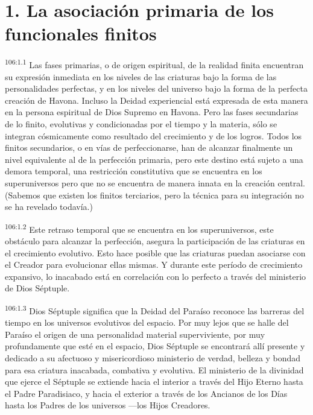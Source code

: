\section*{1. La asociación primaria de los funcionales finitos}
\par
\textsuperscript{106:1.1} Las fases primarias, o de origen espiritual, de la realidad finita encuentran su expresión inmediata en los niveles de las criaturas bajo la forma de las personalidades perfectas, y en los niveles del universo bajo la forma de la perfecta creación de Havona. Incluso la Deidad experiencial está expresada de esta manera en la persona espiritual de Dios Supremo en Havona. Pero las fases secundarias de lo finito, evolutivas y condicionadas por el tiempo y la materia, sólo se integran cósmicamente como resultado del crecimiento y de los logros. Todos los finitos secundarios, o en vías de perfeccionarse, han de alcanzar finalmente un nivel equivalente al de la perfección primaria, pero este destino está sujeto a una demora temporal, una restricción constitutiva que se encuentra en los superuniversos pero que no se encuentra de manera innata en la creación central. (Sabemos que existen los finitos terciarios, pero la técnica para su integración no se ha revelado todavía.)

\par
\textsuperscript{106:1.2} Este retraso temporal que se encuentra en los superuniversos, este obstáculo para alcanzar la perfección, asegura la participación de las criaturas en el crecimiento evolutivo. Esto hace posible que las criaturas puedan asociarse con el Creador para evolucionar ellas mismas. Y durante este período de crecimiento expansivo, lo inacabado está en correlación con lo perfecto a través del ministerio de Dios Séptuple.

\par
\textsuperscript{106:1.3} Dios Séptuple significa que la Deidad del Paraíso reconoce las barreras del tiempo en los universos evolutivos del espacio. Por muy lejos que se halle del Paraíso el origen de una personalidad material superviviente, por muy profundamente que esté en el espacio, Dios Séptuple se encontrará allí presente y dedicado a su afectuoso y misericordioso ministerio de verdad, belleza y bondad para esa criatura inacabada, combativa y evolutiva. El ministerio de la divinidad que ejerce el Séptuple se extiende hacia el interior a través del Hijo Eterno hasta el Padre Paradisiaco, y hacia el exterior a través de los Ancianos de los Días hasta los Padres de los universos ---los Hijos Creadores.

